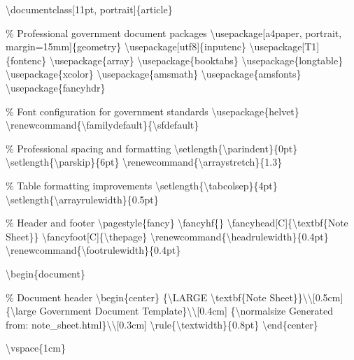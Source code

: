 \textbackslash{}documentclass[11pt, portrait]\{article\}

\% Professional government document packages
\textbackslash{}usepackage[a4paper, portrait, margin=15mm]\{geometry\}
\textbackslash{}usepackage[utf8]\{inputenc\}
\textbackslash{}usepackage[T1]\{fontenc\}
\textbackslash{}usepackage\{array\}
\textbackslash{}usepackage\{booktabs\}
\textbackslash{}usepackage\{longtable\}
\textbackslash{}usepackage\{xcolor\}
\textbackslash{}usepackage\{amsmath\}
\textbackslash{}usepackage\{amsfonts\}
\textbackslash{}usepackage\{fancyhdr\}

\% Font configuration for government standards
\textbackslash{}usepackage\{helvet\}
\textbackslash{}renewcommand\{\textbackslash{}familydefault\}\{\textbackslash{}sfdefault\}

\% Professional spacing and formatting
\textbackslash{}setlength\{\textbackslash{}parindent\}\{0pt\}
\textbackslash{}setlength\{\textbackslash{}parskip\}\{6pt\}
\textbackslash{}renewcommand\{\textbackslash{}arraystretch\}\{1.3\}

\% Table formatting improvements
\textbackslash{}setlength\{\textbackslash{}tabcolsep\}\{4pt\}
\textbackslash{}setlength\{\textbackslash{}arrayrulewidth\}\{0.5pt\}

\% Header and footer
\textbackslash{}pagestyle\{fancy\}
\textbackslash{}fancyhf\{\}
\textbackslash{}fancyhead[C]\{\textbackslash{}textbf\{Note Sheet\}\}
\textbackslash{}fancyfoot[C]\{\textbackslash{}thepage\}
\textbackslash{}renewcommand\{\textbackslash{}headrulewidth\}\{0.4pt\}
\textbackslash{}renewcommand\{\textbackslash{}footrulewidth\}\{0.4pt\}

\textbackslash{}begin\{document\}

\% Document header
\textbackslash{}begin\{center\}
\{\textbackslash{}LARGE \textbackslash{}textbf\{Note Sheet\}\}\textbackslash{}\textbackslash{}[0.5cm]
\{\textbackslash{}large Government Document Template\}\textbackslash{}\textbackslash{}[0.4cm]
\{\textbackslash{}normalsize Generated from: note\_sheet.html\}\textbackslash{}\textbackslash{}[0.3cm]
\textbackslash{}rule\{\textbackslash{}textwidth\}\{0.8pt\}
\textbackslash{}end\{center\}

\textbackslash{}vspace\{1cm\}

